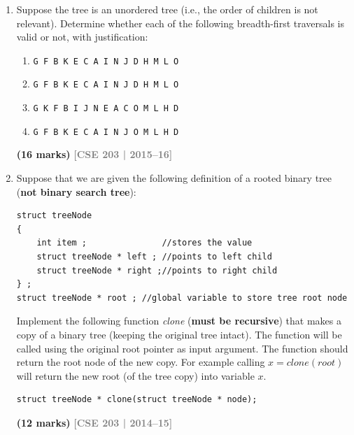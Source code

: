 \documentclass[12pt,a3paper]{article}
\newcommand{\yr}[1]{\hfill\textcolor{gray}{\small\textbf{[#1]}}}
\newcommand{\mk}[1]{\textcolor{orange!70!black}{\small\textbf{(#1 marks)}}}
\begin{document}
\begin{enumerate}
\item Suppose the tree is an unordered tree (i.e., the order of children is not relevant). Determine whether each of the following breadth-first traversals is valid or not, with justification:
\begin{enumerate}
  \item \texttt{G F B K E C A I N J D H M L O}
  \item \texttt{G F B K E C A I N J D H M L O}
  \item \texttt{G K F B I J N E A C O M L H D}
  \item \texttt{G F B K E C A I N J O M L H D}
\end{enumerate}
\mk{16}
\yr{CSE 203 | 2015--16}
\begin{center}
\end{center}

\item Suppose that we are given the following definition of a rooted binary tree
(\textbf{not binary search tree}):
\begin{verbatim}
struct treeNode
{
    int item ;               //stores the value
    struct treeNode * left ; //points to left child
    struct treeNode * right ;//points to right child
} ;
struct treeNode * root ; //global variable to store tree root node
\end{verbatim}
Implement the following function \textit{clone} (\textbf{must be recursive}) that
makes a copy of a binary tree (keeping the original tree intact). The function will
be called using the original root pointer as input argument. The function should
return the root node of the new copy. For example calling $x = clone(root)$ will
return the new root (of the tree copy) into variable $x$.
\begin{verbatim}
struct treeNode * clone(struct treeNode * node);
\end{verbatim}
\mk{12}
\yr{CSE 203 | 2014--15}


\end{enumerate}
\end{document}
